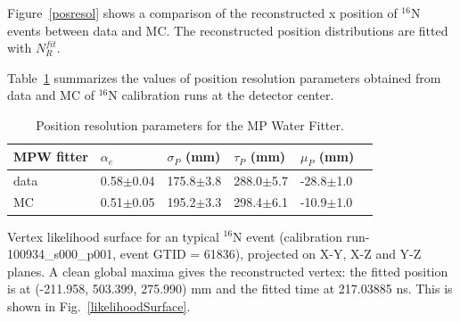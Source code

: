 Figure~\ref{posresol} shows a comparison of the reconstructed x position of {$^{16}$}N events between data and MC. The reconstructed position distributions are fitted with $N_R^{fit}$.


Table~\ref{table_posresol} summarizes the values of position resolution parameters obtained from data and MC of {$^{16}$}N calibration runs at the detector center.
\vspace{1mm}
\begin{table}[ht]
	\centering
	\caption{Position resolution parameters for the MP Water Fitter.}
	\label{table_posresol}
	\begin{tabular}{|p{2.5cm}|p{2.2cm}|p{2.1cm}|p{2.1cm}|p{2.1cm}| p{2.1cm}|}
		\hline
		MPW fitter & $\alpha_e$ & $\sigma_P$ (mm) &  $\tau_P$ (mm)& $\mu_P$ (mm)\\
		\hline 
		data& 0.58$\pm$0.04 & 175.8$\pm$3.8 & 288.0$\pm$5.7 & -28.8$\pm$1.0\\	
		\hline 
		MC & 0.51$\pm$0.05 & 195.2$\pm$3.3 & 298.4$\pm$6.1 & -10.9$\pm$1.0\\
		\hline
	\end{tabular}
\end{table}
\vspace{1mm}

Vertex likelihood surface for an typical {$^{16}$}N event (calibration run-100934\_s000\_p001, event GTID = 61836), projected on X-Y, X-Z and Y-Z planes. A clean global maxima gives the reconstructed vertex: the fitted position is at (-211.958, 503.399, 275.990) mm and the fitted time at 217.03885 ns. This is shown in Fig.~\ref{likelihoodSurface}. 

